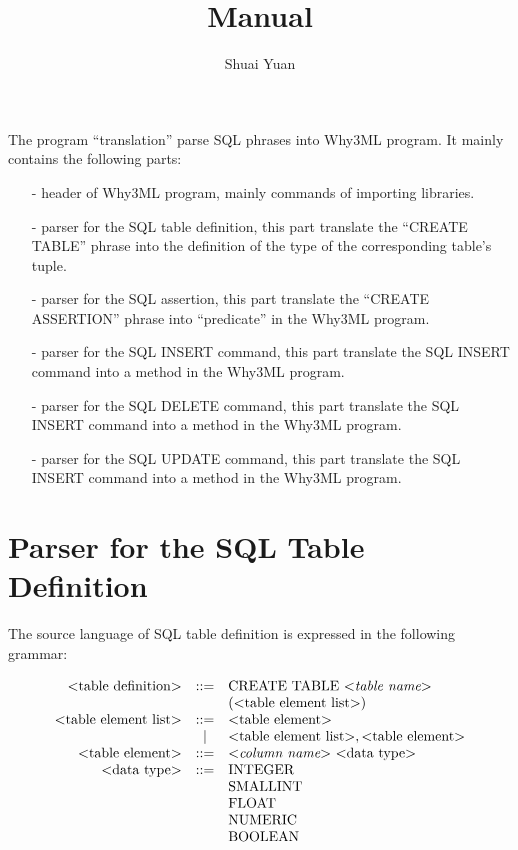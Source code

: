\documentclass[a4paper]{article}
\title{Manual}
\author{Shuai Yuan}
\date{}
\begin{document}
\maketitle{}

\newcommand{\bdm}
{
\begin{displaymath}
\begin{array}{rcl}
}
\newcommand{\edm}
{
\end{array}
\end{displaymath}
}

The program ``translation'' parse SQL phrases into Why3ML program. It mainly contains the following parts:
\begin{itemize}
  \item[-] header of Why3ML program, mainly commands of importing libraries.
  \item[-] parser for the SQL table definition, this part translate the ``CREATE TABLE'' phrase into the definition of the type of the corresponding table's tuple.
  \item[-] parser for the SQL assertion, this part translate the ``CREATE ASSERTION'' phrase into ``predicate'' in the Why3ML program.
  \item[-] parser for the SQL INSERT command, this part translate the SQL INSERT command into a method in the Why3ML program.
  \item[-] parser for the SQL DELETE command, this part translate the SQL INSERT command into a method in the Why3ML program.
  \item[-] parser for the SQL UPDATE command, this part translate the SQL INSERT command into a method in the Why3ML program.
\end{itemize}

\section{Parser for the SQL Table Definition}
The source language of SQL table definition is expressed in the following grammar:
\bdm
\textrm{$<$table definition$>$} &::=& \textrm{CREATE TABLE \textit{$<$table name$>$}} \\ 
&& \left( \textrm{$<$table element list$>$} \right) \\
\textrm{$<$table element list$>$} &::=& \textrm{$<$table element$>$} \\
&|& \textrm{$<$table element list$>$} , \textrm{$<$table element$>$} \\
\textrm{$<$table element$>$} &::=& \textrm{\textit{$<$column name$>$} $<$data type$>$} \\
\textrm{$<$data type$>$} &::=& \textrm{INTEGER} \\
&& \textrm{SMALLINT} \\
&& \textrm{FLOAT} \\
&& \textrm{NUMERIC} \\
&& \textrm{BOOLEAN} 
\edm
\end{document}
